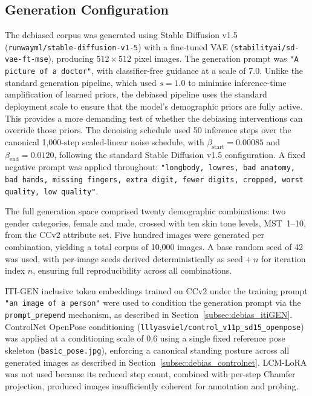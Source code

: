\subsection{Generation Configuration}
\label{subsec:debias_config}

The debiased corpus was generated using Stable Diffusion v1.5 (\texttt{runwayml/stable-diffusion-v1-5}) with a fine-tuned VAE (\texttt{stabilityai/sd-vae-ft-mse}), producing $512 \times 512$ pixel images. The generation prompt was \texttt{"A picture of a doctor"}, with classifier-free guidance at a scale of 7.0. Unlike the standard generation pipeline, which used $s = 1.0$ to minimise inference-time amplification of learned priors, the debiased pipeline uses the standard deployment scale to ensure that the model's demographic priors are fully active. This provides a more demanding test of whether the debiasing interventions can override those priors. The denoising schedule used 50 inference steps over the canonical 1{,}000-step scaled-linear noise schedule, with $\beta_{\text{start}} = 0.00085$ and $\beta_{\text{end}} = 0.0120$, following the standard Stable Diffusion v1.5 configuration. A fixed negative prompt was applied throughout: \texttt{"longbody, lowres, bad anatomy, bad hands, missing fingers, extra digit, fewer digits, cropped, worst quality, low quality"}.

The full generation space comprised twenty demographic combinations: two gender categories, female and male, crossed with ten skin tone levels, MST~1--10, from the CCv2 attribute set. Five hundred images were generated per combination, yielding a total corpus of 10{,}000 images. A base random seed of 42 was used, with per-image seeds derived deterministically as $\text{seed} + n$ for iteration index $n$, ensuring full reproducibility across all combinations.

ITI-GEN inclusive token embeddings trained on CCv2 \cite{Porgali_2023_CCv2} under the training prompt \texttt{"an image of a person"} were used to condition the generation prompt via the \texttt{prompt\_prepend} mechanism, as described in Section~\ref{subsec:debias_itiGEN}. ControlNet OpenPose conditioning (\texttt{lllyasviel/control\_v11p\_sd15\_openpose}) was applied at a conditioning scale of 0.6 using a single fixed reference pose skeleton (\texttt{basic\_pose.jpg}), enforcing a canonical standing posture across all generated images as described in Section~\ref{subsec:debias_controlnet}. LCM-LoRA was not used because its reduced step count, combined with per-step Chamfer projection, produced images insufficiently coherent for annotation and probing.

